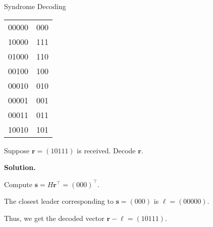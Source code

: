 \begin{Example}{Syndrome Decoding}{}
\begin{table}[H]
\begin{tabularx}{0.5\linewidth}{@{}YY@{}}
            00000         & 000       \\
            10000         & 111       \\
            01000         & 110       \\
            00100         & 100       \\
            00010         & 010       \\
            00001         & 001       \\
            00011         & 011       \\
            10010         & 101
        \end{tabularx}
    \end{table}
    Suppose $ \symbf{r}=(10111) $ is received. Decode $ \symbf{r} $.

    \textbf{Solution.}

    Compute $ \symbf{s}=H\symbf{r}^\top=(000)^\top $.

    The closest leader corresponding to $ \symbf{s}=(000) $ is $ \symbf{\ell}=(00000) $.

    Thus, we get the decoded vector $ \symbf{r}-\symbf{\ell}=(10111) $.
\end{Example}
